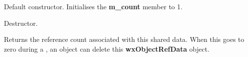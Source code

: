 



\label{wxobjectrefdatactor}


Default constructor. Initialises the {\bf m\_count} member to 1.

\label{wxobjectrefdatadtor}


Destructor.

\label{wxobjectrefdatagetrefcount}


Returns the reference count associated with this shared data.
When this goes to zero during a , an object
can delete this {\bf wxObjectRefData} object.

